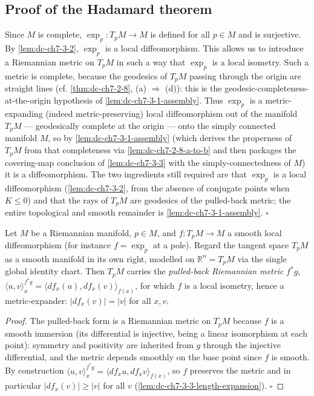 \subsection{Proof of the Hadamard theorem}
Since $M$ is complete, $\exp_p:T_pM\to M$ is defined for all $p\in M$ and is
surjective. By \cref{lem:dc-ch7-3-2}, $\exp_p$ is a local diffeomorphism. This allows us to
introduce a Riemannian metric on $T_pM$ in such a way that $\exp_p$ is a local
isometry. Such a metric is complete, because the geodesics of $T_pM$ passing
through the origin are straight lines (cf. \cref{thm:dc-ch7-2-8}, (a) $\Rightarrow$ (d)):
this is the geodesic-completeness-at-the-origin hypothesis of \cref{lem:dc-ch7-3-1-assembly}.
Thus $\exp_p$ is a metric-expanding (indeed metric-preserving) local diffeomorphism
out of the manifold $T_pM$ — geodesically complete at the origin — onto the simply connected
manifold $M$, so by \cref{lem:dc-ch7-3-1-assembly} (which derives the properness of $T_pM$
from that completeness via \cref{lem:dc-ch7-2-8-a-to-b} and then packages the covering-map
conclusion of \cref{lem:dc-ch7-3-3} with the simply-connectedness of $M$) it is a
diffeomorphism. The two ingredients still required are that $\exp_p$ is a local
diffeomorphism (\cref{lem:dc-ch7-3-2}, from the absence of conjugate points when $K\le 0$)
and that the rays of $T_pM$ are geodesics of the pulled-back metric; the entire
topological and smooth remainder is \cref{lem:dc-ch7-3-1-assembly}.
$\square$

\begin{lemma}
  \label{lem:dc-ch7-3-4-pullback-metric}
  \leanok
  Let $M$ be a Riemannian manifold, $p\in M$, and $f:T_pM\to M$ a smooth local
  diffeomorphism (for instance $f=\exp_p$ at a pole). Regard the tangent space $T_pM$ as
  a smooth manifold in its own right, modelled on $\mathbb R^n=T_pM$ via the single global
  identity chart. Then $T_pM$ carries the \emph{pulled-back Riemannian metric} $f^*g$,
  $\langle u,v\rangle^{f^*g}_x=\langle df_x(u),df_x(v)\rangle_{f(x)}$, for which $f$ is a
  local isometry, hence a metric-expander: $|df_x(v)|=|v|$ for all $x,v$.
\end{lemma}
\begin{proof}
  \leanok
  The pulled-back form is a Riemannian metric on $T_pM$ because $f$ is a smooth
  immersion (its differential is injective, being a linear isomorphism at each point):
  symmetry and positivity are inherited from $g$ through the injective differential, and
  the metric depends smoothly on the base point since $f$ is smooth. By construction
  $\langle u,v\rangle^{f^*g}_x=\langle df_x u,df_x v\rangle_{f(x)}$, so $f$ preserves the
  metric and in particular $|df_x(v)|\ge|v|$ for all $v$
  (\cref{lem:dc-ch7-3-3-length-expansion}). $\square$
\end{proof}


